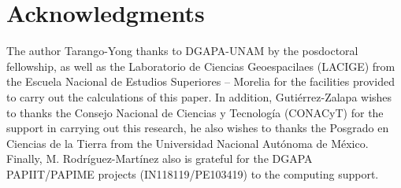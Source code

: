 \documentclass[times,twocolumn,final,authoryear]{elsarticle}
\begin{document}


\section{Acknowledgments}
The author Tarango-Yong thanks to DGAPA-UNAM by the posdoctoral fellowship, as well as the Laboratorio de Ciencias Geoespacilaes (LACIGE) from the Escuela Nacional de Estudios Superiores -- Morelia for the facilities provided to carry out the calculations of this paper. In addition, Gutiérrez-Zalapa wishes to thanks the
Consejo Nacional de Ciencias y Tecnología (CONACyT) for the support in carrying out this research, he also wishes to thanks the Posgrado en Ciencias de la Tierra from the Universidad Nacional Autónoma de México. Finally, M. Rodr\'iguez-Mart\'inez also is grateful for the DGAPA PAPIIT/PAPIME projects (IN118119/PE103419) to the computing support.
%
  


\end{document}
